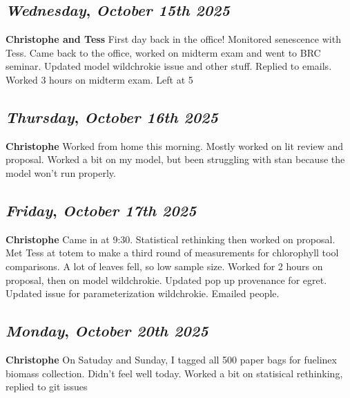 \begin{center}
\section*{\month}
\end{center}

\def\day{\textit{October 15th 2025}}
\def\weekday{\textit{Wednesday}}
\subsection*{\weekday, \day}
\textbf {Christophe and Tess}
First day back in the office! Monitored senescence with Tess. Came back to the office, worked on midterm exam and went to BRC seminar. Updated model wildchrokie issue and other stuff. Replied to emails. Worked 3 hours on midterm exam. Left at 5

\def\day{\textit{October 16th 2025}}
\def\weekday{\textit{Thursday}}
\subsection*{\weekday, \day}
\textbf {Christophe}
Worked from home this morning. Mostly worked on lit review and proposal. Worked a bit on my model, but been struggling with stan because the model won't run properly.

\def\day{\textit{October 17th 2025}}
\def\weekday{\textit{Friday}}
\subsection*{\weekday, \day}
\textbf {Christophe}
Came in at 9:30. Statistical rethinking then worked on proposal. Met Tess at totem to make a third round of measurements for chlorophyll tool comparisons. A lot of leaves fell, so low sample size. Worked for 2 hours on proposal, then on model wildchrokie. Updated pop up provenance for egret. Updated issue for parameterization wildchrokie. Emailed people.

\def\day{\textit{October 20th 2025}}
\def\weekday{\textit{Monday}}
\subsection*{\weekday, \day}
\textbf {Christophe}
On Satuday and Sunday, I tagged all 500 paper bags for fuelinex biomass collection. 
Didn't feel well today. Worked a bit on statisical rethinking, replied to git issues

\def\day{\textit{October 21st 2025}}
\def\weekday{\textit{Tuesday}}
